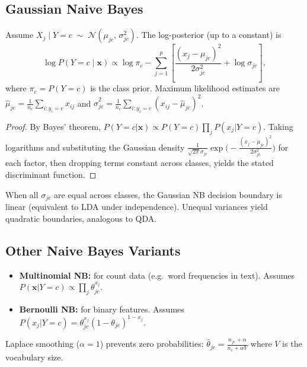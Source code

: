 \subsection{Gaussian Naive Bayes}

\begin{theorem}
Assume $X_j \mid Y=c \;\sim\; \mathcal{N}(\mu_{jc},\,\sigma_{jc}^2)$. The log-posterior (up to a constant) is
\[
    \log P(Y=c\mid\bm{x})
    \propto \log\pi_c - \sum_{j=1}^{p}\left[\frac{(x_j - \mu_{jc})^2}{2\sigma_{jc}^2} + \log\sigma_{jc}\right],
\]
where $\pi_c = P(Y=c)$ is the class prior. Maximum likelihood estimates are $\hat{\mu}_{jc} = \frac{1}{n_c}\sum_{i:y_i=c}x_{ij}$ and $\hat{\sigma}_{jc}^2 = \frac{1}{n_c}\sum_{i:y_i=c}(x_{ij}-\hat{\mu}_{jc})^2$.
\end{theorem}

\begin{proof}
By Bayes' theorem, $P(Y=c|\bm{x}) \propto P(Y=c)\prod_j P(x_j|Y=c)$. Taking logarithms and substituting the Gaussian density $\frac{1}{\sqrt{2\pi}\sigma_{jc}}\exp\!\bigl(-\frac{(x_j-\mu_{jc})^2}{2\sigma_{jc}^2}\bigr)$ for each factor, then dropping terms constant across classes, yields the stated discriminant function.
\end{proof}

\begin{proposition}
When all $\sigma_{jc}$ are equal across classes, the Gaussian NB decision boundary is linear (equivalent to LDA under independence). Unequal variances yield quadratic boundaries, analogous to QDA.
\end{proposition}

\subsection{Other Naive Bayes Variants}

\begin{definition}
\begin{itemize}
    \item \textbf{Multinomial NB:} for count data (e.g.\ word frequencies in text). Assumes $P(\bm{x}|Y=c) \propto \prod_j \theta_{jc}^{x_j}$.
    \item \textbf{Bernoulli NB:} for binary features. Assumes $P(x_j|Y=c) = \theta_{jc}^{x_j}(1-\theta_{jc})^{1-x_j}$.
\end{itemize}
Laplace smoothing ($\alpha=1$) prevents zero probabilities: $\hat{\theta}_{jc} = \frac{n_{jc}+\alpha}{n_c + \alpha V}$ where $V$ is the vocabulary size.
\end{definition}

